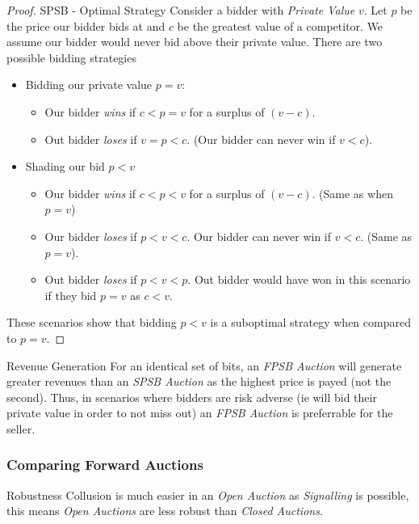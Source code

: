 \documentclass[11pt,a4paper]{article}
\begin{document}
  \begin{proof}{SPSB - Optimal Strategy}
    Consider a bidder with \textit{Private Value} $v$. Let $p$ be the price our bidder bids at and $c$ be the greatest value of a competitor. We assume our bidder would never bid above their private value. There are two possible bidding strategies
    \begin{itemize}
      \item Bidding our private value $p=v$:
      \begin{itemize}
        \item Our bidder \textit{wins} if $c<p=v$ for a surplus of $(v-c)$.
        \item Out bidder \textit{loses} if $v=p<c$. (Our bidder can never win if $v<c$).
      \end{itemize}

      \item Shading our bid $p<v$
      \begin{itemize}
        \item Our bidder \textit{wins} if $c<p<v$ for a surplus of $(v-c)$. (Same as when $p=v$)
        \item Our bidder \textit{loses} if  $p<v<c$. Our bidder can never win if $v<c$. (Same as $p=v$).
        \item Out bidder \textit{loses} if $p<v<p$. Out bidder would have won in this scenario if they bid $p=v$ as $c<v$.
      \end{itemize}
    \end{itemize}
    These scenarios show that bidding $p<v$ is a suboptimal strategy when compared to $p=v$.
  \end{proof}

  \begin{remark}{Revenue Generation}
    For an identical set of bits, an \textit{FPSB Auction} will generate greater revenues than an \textit{SPSB Auction} as the highest price is payed (not the second). Thus, in scenarios where bidders are risk adverse (ie will bid their private value in order to not miss out) an \textit{FPSB Auction} is preferrable for the seller.
  \end{remark}

\subsubsection{Comparing Forward Auctions} \label{sec_ComparingForward}

  \begin{remark}{Robustness}
    Collusion is much easier in an \textit{Open Auction} as \textit{Signalling} is possible, this means \textit{Open Auctions} are less robust than \textit{Closed Auctions}.
  \end{remark}
\end{document}
